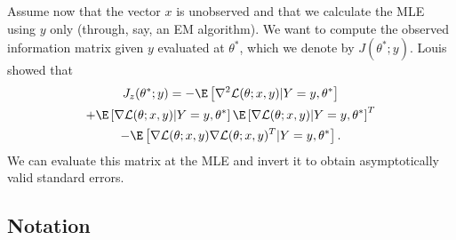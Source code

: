 \documentclass[12pt]{article}
\begin{document}
Assume now that the vector $x$ is unobserved and that we calculate the MLE using $y$ only (through, say, an EM algorithm). We want to compute the observed information matrix given $y$ evaluated at $\theta^*$, which we denote by $J(\theta^*; y)$. Louis showed that 
\begin{multline}\label{Louis_formula}
J_z(\theta^*; y) = -\E \left[\nabla^2 \mathcal{L}(\theta; x, y) | Y = y, \theta^* \right]  \\ + \E\left[ \nabla \mathcal{L}(\theta; x, y) | Y = y, \theta^* \right] \E\left[ \nabla \mathcal{L}(\theta; x, y) | Y = y, \theta^* \right]^T \\ - \E \left[ \nabla\mathcal{L}(\theta; x, y) \nabla \mathcal{L}(\theta; x, y)^T | Y = y, \theta^* \right].
\end{multline}
We can evaluate this matrix at the MLE and invert it to obtain asymptotically valid standard errors. %

\subsection{Notation}\label{notation}
\end{document}
